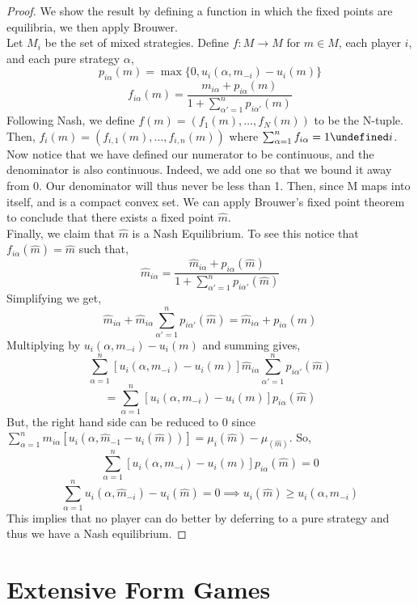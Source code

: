 \documentclass[dvips,11pt]{article}
\let\oldforall\forall
\let\forall\undefined
\DeclareMathOperator{\forall}{\,\oldforall\,}
\DeclareMathOperator{\?}{\,?\,}
\begin{document}
\begin{proof}
We show the result by defining a function in which the fixed points are equilibria, we then apply Brouwer. 
\\ Let $M_i$ be the set of mixed strategies. Define $f:M\rightarrow M$ for $m\in M$, each player $i$, and each pure strategy $\alpha$,
$$p_{i\alpha}(m) = \max\{0, u_i(\alpha,m_{-i})-u_i(m)\}$$
$$f_{i\alpha}(m) = \frac{m_{i\alpha}+p_{i\alpha}(m)}{1+\sum^n_{\alpha'=1}p_{i\alpha'}(m)}$$
Following Nash, we define $f(m) = (f_1(m),\dots,f_N(m))$ to be the N-tuple. Then, $f_{i}(m) = (f_{i,1}(m),\dots,f_{i,n}(m))$ where $\sum^n_{\alpha=1} f_{i\alpha} = 1 \forall i$.
\\ Now notice that we have defined our numerator to be continuous, and the denominator is also continuous. Indeed, we add one so that we bound it away from 0. Our denominator will thus never be less than 1. Then, since M maps into itself, and is a compact convex set. We can apply Brouwer's fixed point theorem to conclude that there exists a fixed point $\hat{m}$.
\\ Finally, we claim that $\hat{m}$ is a Nash Equilibrium. To see this notice that $f_{i\alpha}(\hat{m}) = \hat{m}$ such that,
$$\hat{m}_{i\alpha} = \frac{\hat{m}_{i\alpha} + p_{i\alpha}(\hat{m})}{1 + \sum^n_{\alpha'=1}p_{i\alpha'}(\hat{m})}$$
Simplifying we get,
$$\hat{m}_{i\alpha} + \hat{m}_{i\alpha}\sum^n_{\alpha'=1}p_{i\alpha'}(\hat{m}) = \hat{m}_{i\alpha} + p_{i\alpha}(\hat{m})$$
Multiplying by $u_i(\alpha,m_{-i})-u_i(m)$ and summing gives,
$$ \sum_{\alpha=1}^n[u_i(\alpha,m_{-i})-u_i(m)]\hat{m}_{i\alpha}\sum^n_{\alpha'=1}p_{i\alpha'}(\hat{m})$$$$ =  \sum^n_{\alpha=1}[u_i(\alpha,m_{-i})-u_i(m)]p_{i\alpha}(\hat{m})
$$
But, the right hand side can be reduced to 0 since $\sum^n_{\alpha=1}m_{i\alpha}[u_i(\alpha,\hat{m}_{-1}-u_i(\hat{m}))] = \mu_i(\hat{m})-\mu_(\hat{m})$.
So,
$$\sum^n_{\alpha=1}[u_i(\alpha,m_{-i})-u_i(m)]p_{i\alpha}(\hat{m}) = 0$$
$$\sum^n_{\alpha=1}u_i(\alpha,\hat{m}_{-i})-u_i(\hat{m}) = 0 \implies u_i(\hat{m})\geq u_i(\alpha, \hat{m}_{-i})$$
This implies that no player can do better by deferring to a pure strategy and thus we have a Nash equilibrium. 
\end{proof} 
\section{Extensive Form Games}
\end{document}
